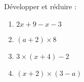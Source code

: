 
\begin{exercice}\label{exo2smath-0249}

    Développer et réduire :
    \begin{multicols}{2}
        \begin{enumerate}
            \item
                \( 2x+9-x-3\)
            \item
                \( (a+2)\times 8\)
            \item
                \( 3\times (x+4)-2\)
            \item
                \( (x+2)\times (3-a)\)
        \end{enumerate}
    \end{multicols}

\end{exercice}
